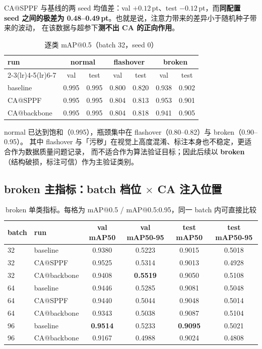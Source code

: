 \documentclass[UTF8,a4paper,11pt]{ctexart}
\begin{document}
CA@SPPF 与基线的两 seed 均值差：val $+0.12$\,pt、test $-0.12$\,pt，而\textbf{同配置
seed 之间的极差为 0.48--0.49\,pt}。也就是说，注意力带来的差异小于随机种子带来的波动，
在该数据与超参下\textbf{测不出 CA 的正向作用}。

\begin{table}[htbp]
\centering
\caption{逐类 mAP@0.5（batch 32，seed 0）}
\begin{tabular}{lcccccc}
\toprule
run & \multicolumn{2}{c}{normal} & \multicolumn{2}{c}{flashover} & \multicolumn{2}{c}{broken} \\
\cmidrule(lr){2-3}\cmidrule(lr){4-5}\cmidrule(lr){6-7}
 & val & test & val & test & val & test \\
\midrule
baseline        & 0.995 & 0.995 & 0.800 & 0.820 & 0.938 & 0.902 \\
CA@SPPF         & 0.995 & 0.995 & 0.804 & 0.813 & 0.953 & 0.901 \\
CA@backbone     & 0.995 & 0.995 & 0.804 & 0.818 & 0.941 & 0.905 \\
\bottomrule
\end{tabular}
\end{table}

normal 已达到饱和（0.995），瓶颈集中在 flashover（0.80--0.82）与 broken（0.90--0.95）。
其中 flashover 与「污秽」在视觉上高度混淆、标注本身也不稳定，更适合作为数据质量问题记录，
而不适合作为算法验证目标；因此后续以 \textbf{broken}（结构破损，标注可信）作为主验证类别。

\subsection{broken 主指标：batch 档位 $\times$ CA 注入位置}

\begin{table}[htbp]
\centering
\caption{broken 单类指标。每格为 mAP@0.5 / mAP@0.5:0.95，同一 batch 内可直接比较}
\label{tab:broken}
\begin{tabular}{llcccc}
\toprule
batch & run & val mAP50 & val mAP50-95 & test mAP50 & test mAP50-95 \\
\midrule
32 & baseline      & 0.9380 & 0.5223 & 0.9015 & 0.5018 \\
32 & CA@SPPF       & 0.9525 & 0.5314 & 0.9013 & 0.4928 \\
32 & CA@backbone   & 0.9408 & \textbf{0.5519} & 0.9050 & 0.5108 \\
\midrule
64 & baseline      & 0.9446 & 0.5285 & 0.9081 & 0.5048 \\
64 & CA@SPPF       & 0.9440 & 0.5044 & 0.9048 & 0.5014 \\
64 & CA@backbone   & 0.9343 & 0.5038 & 0.9087 & 0.5104 \\
\midrule
96 & baseline      & \textbf{0.9514} & 0.5233 & \textbf{0.9095} & 0.5021 \\
96 & CA@backbone   & 0.9167 & 0.4988 & 0.9024 & 0.4808 \\
\bottomrule
\end{tabular}
\end{table}
\end{document}
